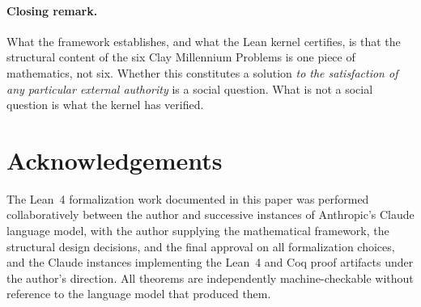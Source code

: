 \documentclass[11pt,a4paper]{article}
\theoremstyle{definition}
\begin{document}
\paragraph{Closing remark.} What the framework establishes, and
what the Lean kernel certifies, is that the structural content of
the six Clay Millennium Problems is one piece of mathematics, not
six. Whether this constitutes a solution \emph{to the satisfaction
of any particular external authority} is a social question. What is
not a social question is what the kernel has verified.

\section*{Acknowledgements}

The Lean~4 formalization work documented in this paper was performed
collaboratively between the author and successive instances of
Anthropic's Claude language model, with the author supplying the
mathematical framework, the structural design decisions, and the
final approval on all formalization choices, and the Claude
instances implementing the Lean~4 and Coq proof artifacts under the
author's direction. All theorems are independently machine-checkable
without reference to the language model that produced them.
\end{document}
